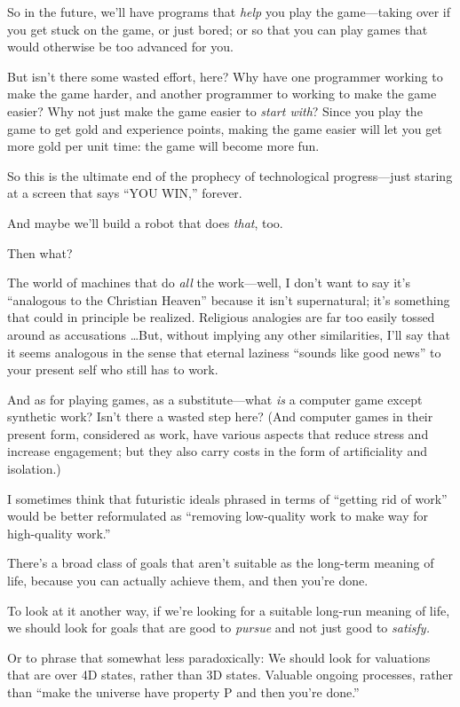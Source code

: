 {
 So in the future, we'll have programs that
\textit{help} you play the game---taking over if you get stuck on the
game, or just bored; or so that you can play games that would otherwise
be too advanced for you.}

{
 But isn't there some wasted effort, here? Why have
one programmer working to make the game harder, and another programmer
to working to make the game easier? Why not just make the game easier
to \textit{start with}? Since you play the game to get gold and
experience points, making the game easier will let you get more gold
per unit time: the game will become more fun.}

{
 So this is the ultimate end of the prophecy of technological
progress---just staring at a screen that says ``YOU
WIN,'' forever.}

{
 And maybe we'll build a robot that does
\textit{that}, too.}

{
 Then what?}

{
 The world of machines that do \textit{all} the work---well, I
don't want to say it's
``analogous to the Christian
Heaven'' because it isn't
supernatural; it's something that could in principle be
realized. Religious analogies are far too easily tossed around as
accusations \ldots But, without implying any other similarities,
I'll say that it seems analogous in the sense that
eternal laziness ``sounds like good
news'' to your present self who still has to work.}

{
 And as for playing games, as a substitute---what \textit{is} a
computer game except synthetic work? Isn't there a
wasted step here? (And computer games in their present form, considered
as work, have various aspects that reduce stress and increase
engagement; but they also carry costs in the form of artificiality and
isolation.)}

{
 I sometimes think that futuristic ideals phrased in terms of
``getting rid of work'' would be
better reformulated as ``removing low-quality work to
make way for high-quality work.''}

{
 There's a broad class of goals that
aren't suitable as the long-term meaning of life,
because you can actually achieve them, and then you're
done.}

{
 To look at it another way, if we're looking for a
suitable long-run meaning of life, we should look for goals that are
good to \textit{pursue} and not just good to \textit{satisfy.}}

{
 Or to phrase that somewhat less paradoxically: We should look for
valuations that are over 4D states, rather than 3D states. Valuable
ongoing processes, rather than ``make the universe
have property P and then you're
done.''}

